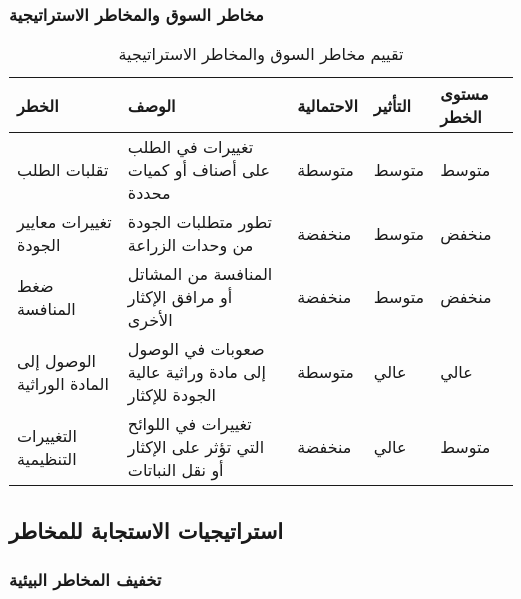 \subsubsection{مخاطر السوق والمخاطر الاستراتيجية}

\begin{table}[h]
\centering
\begin{tabular}{|p{3cm}|p{4cm}|p{2cm}|p{2cm}|p{3cm}|}
\hline
\textbf{الخطر} & \textbf{الوصف} & \textbf{الاحتمالية} & \textbf{التأثير} & \textbf{مستوى الخطر} \\
\hline
تقلبات الطلب & تغييرات في الطلب على أصناف أو كميات محددة & متوسطة & متوسط & متوسط \\
\hline
تغييرات معايير الجودة & تطور متطلبات الجودة من وحدات الزراعة & منخفضة & متوسط & منخفض \\
\hline
ضغط المنافسة & المنافسة من المشاتل أو مرافق الإكثار الأخرى & منخفضة & متوسط & منخفض \\
\hline
الوصول إلى المادة الوراثية & صعوبات في الوصول إلى مادة وراثية عالية الجودة للإكثار & متوسطة & عالي & عالي \\
\hline
التغييرات التنظيمية & تغييرات في اللوائح التي تؤثر على الإكثار أو نقل النباتات & منخفضة & عالي & متوسط \\
\hline
\end{tabular}
\caption{تقييم مخاطر السوق والمخاطر الاستراتيجية}
\end{table}

\subsection{استراتيجيات الاستجابة للمخاطر}

\subsubsection{تخفيف المخاطر البيئية}

